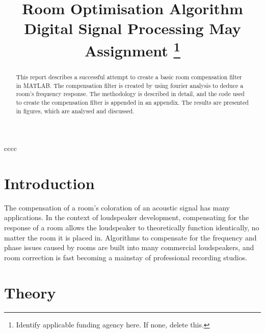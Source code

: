 \documentclass[conference]{IEEEtran}
\begin{document}
\title{Room Optimisation Algorithm\\
{\footnotesize Digital Signal Processing May Assignment}
\thanks{Identify applicable funding agency here. If none, delete this.}
}

\author{
}

\maketitle

\begin{abstract}
    This report describes a successful attempt to create a basic room compensation filter in MATLAB.
    The compensation filter is created by using fourier analysis to deduce a room's frequency response.
    The methodology is described in detail, and the code used to create the compensation filter is appended in an appendix.
    The results are presented in figures, which are analysed and discussed.

\end{abstract}cccc

\section{Introduction}
    The compensation of a room's coloration of an acoustic signal has many applications.
    In the context of loudspeaker development, compensating for the response of a room allows the loudspeaker to theoretically function identically, no matter the room it is placed in.
    Algorithms to compensate for the frequency and phase issues caused by rooms are built into many commercial loudspeakers, and room correction is fast becoming a mainstay of professional recording studios.


\section{Theory}
\end{document}
